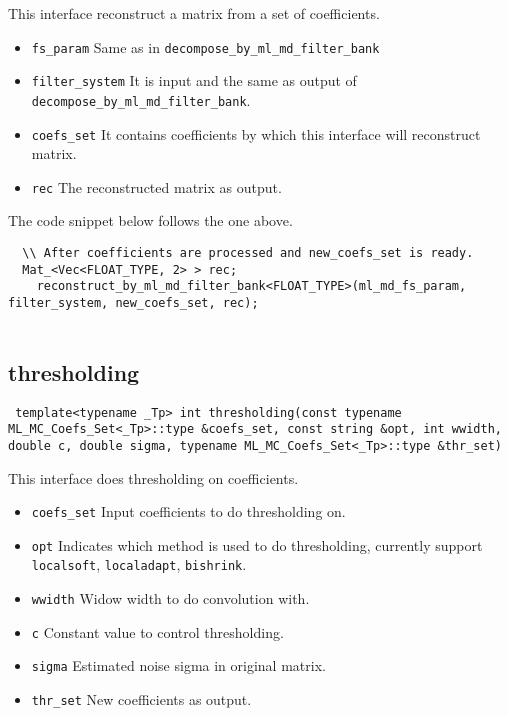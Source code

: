 \documentclass[a4paper,5pt]{article}
\begin{document}
This interface reconstruct a matrix from a set of coefficients.
\begin{itemize}
\item \lstinline{fs_param} Same as in \lstinline{decompose_by_ml_md_filter_bank}
\item \lstinline{filter_system} It is input and the same as output of \lstinline{decompose_by_ml_md_filter_bank}. 

\item \lstinline{coefs_set} It contains coefficients by which this interface will reconstruct matrix.
\item \lstinline{rec} The reconstructed matrix as output. 
\end{itemize}

The code snippet below follows the one above.

\begin{lstlisting}
  \\ After coefficients are processed and new_coefs_set is ready.
  Mat_<Vec<FLOAT_TYPE, 2> > rec;
	reconstruct_by_ml_md_filter_bank<FLOAT_TYPE>(ml_md_fs_param, filter_system, new_coefs_set, rec);
	
\end{lstlisting}

\subsection{thresholding}

\lstinline{ template<typename _Tp> int thresholding(const typename ML_MC_Coefs_Set<_Tp>::type &coefs_set, const string &opt, int wwidth, double c, double sigma, typename ML_MC_Coefs_Set<_Tp>::type &thr_set) }

This interface does thresholding on coefficients.
\begin{itemize}
\item \lstinline{coefs_set} Input coefficients to do thresholding on.
\item \lstinline{opt} Indicates which method is used to do thresholding, currently support \lstinline{localsoft}, \lstinline{localadapt}, \lstinline{bishrink}.
\item \lstinline{wwidth} Widow width to do convolution with.
\item \lstinline{c} Constant value to control thresholding.
\item \lstinline{sigma} Estimated noise sigma in original matrix.
\item \lstinline{thr_set} New coefficients as output.
\end{itemize}
\end{document}
